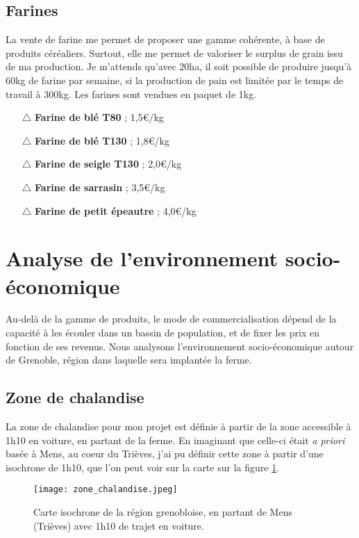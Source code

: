 \documentclass{book}
\begin{document}
\subsection{Farines}

La vente de farine me permet de proposer une gamme cohérente, à base de produits céréaliers. Surtout, elle me permet de valoriser le surplus de grain issu de ma production. Je m'attends qu'avec 20ha, il soit possible de produire jusqu'à 60kg de farine par semaine, si la production de pain est limitée par le temps de travail à 300kg. Les farines sont vendues en paquet de 1kg.
\begin{itemize}

	\item[$\triangle$] \textbf{Farine de blé T80}  ; 1,5\euro{}/kg
	\item[$\triangle$] \textbf{Farine de blé T130} ; 1,8\euro{}/kg
	\item[$\triangle$] \textbf{Farine de seigle T130} ; 2,0\euro{}/kg
	\item[$\triangle$] \textbf{Farine de sarrasin} ; 3,5\euro{}/kg
	\item[$\triangle$] \textbf{Farine de petit épeautre} ; 4,0\euro{}/kg

\end{itemize}

\section{Analyse de l'environnement socio-économique}

Au-delà de la gamme de produits, le mode de commercialisation dépend de la capacité à les écouler dans un bassin de population, et de fixer les prix en fonction de ses revenus. Nous analysons l'environnement socio-économique autour de Grenoble, région dans laquelle sera implantée la ferme.

\subsection{Zone de chalandise}

La zone de chalandise pour mon projet est définie à partir de la zone accessible à 1h10 en voiture, en partant de la ferme. En imaginant que celle-ci était \textit{a priori} basée à Mens, au coeur du Trièves, j’ai pu définir cette zone à partir d’une isochrone de 1h10, que l’on peut voir sur la carte sur la figure \ref{fig:chalandise}. 

\begin{figure}[h!]
\begin{center}
	\texttt{[image: zone\_chalandise.jpeg]}
	\caption{Carte isochrone de la région grenobloise, en partant de Mens (Trièves) avec 1h10 de trajet en voiture.}
	\label{fig:chalandise}
\end{center}
\end{figure}
\end{document}

